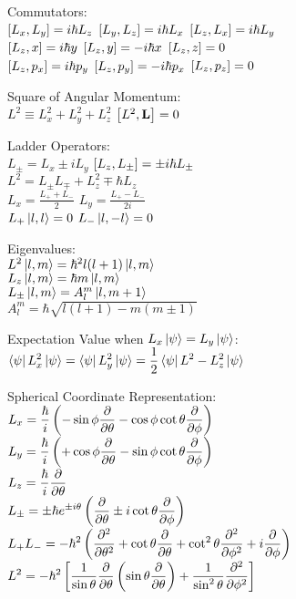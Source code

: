 \documentclass[12pt,landscape]{article}
\newcommand{\tab}{\hspace{.02\textwidth}}
\newcommand{\ds}{\displaystyle}
\begin{document}
\begin{multicols}{3}
Commutators:\\
\tab $\comm{L_x}{L_y} = i\hbar L_z$ \quad $\comm{L_y}{L_z} = i\hbar L_x$ \quad $\comm{L_z}{L_x} = i\hbar L_y$\\
\tab $\comm{L_z}{x} = i\hbar y$ \quad $\comm{L_z}{y} = -i\hbar x$ \quad $\comm{L_z}{z} = 0$\\
\tab $\comm{L_z}{p_x} = i\hbar p_y$ \quad $\comm{L_z}{p_y} = -i\hbar p_x$ \quad $\comm{L_z}{p_z} = 0$

Square of Angular Momentum:\\
\tab $L^2 \equiv L_x^2 + L_y^2 + L_z^2$ \qquad $\comm{L^2}{\vb{L}} = 0$

Ladder Operators:\\
\tab $L_\pm = L_x \pm iL_y$ \qquad $\comm{L_z}{L_\pm} = \pm i\hbar L_\pm$\\
\tab $L^2 = L_\pm L_\mp + L_z^2 \mp \hbar L_z$\\
\tab $\ds L_x = \frac{L_+ + L_-}{2}$ \qquad $\ds L_y = \frac{L_+ - L_-}{2i}$\\
\tab $L_+ \ket{l,l} = 0$ \qquad $L_- \ket{l,-l} =0$

Eigenvalues:\\
\tab $L^2 \ket{l,m} = \hbar^2 l(l+1)\ket{l,m}$\\
\tab $L_z \ket{l,m} = \hbar m \ket{l,m}$\\
\tab $L_\pm \ket{l,m} = A_l^m\ket{l,m+1}$\\
\tab $A_l^m = \hbar \sqrt{l(l+1) - m(m\pm 1)}$

Expectation Value when $L_x\ket{\psi} = L_y\ket{\psi}$:\\
\tab $\ds \bra{\psi}L_x^2\ket{\psi} = \bra{\psi}L_y^2\ket{\psi} = \frac{1}{2}\bra{\psi}L^2 - L_z^2\ket{\psi}$

Spherical Coordinate Representation:\\
\tab $L_x = \ds \frac{\hbar}{i}\left(-\sin\phi \pdv{\theta} - \cos\phi\cot\theta\pdv{\phi}\right)$\\
\tab $L_y = \ds \frac{\hbar}{i}\left(+\cos\phi \pdv{\theta} - \sin\phi\cot\theta\pdv{\phi}\right)$\\
\tab $\ds L_z = \frac{\hbar}{i}\pdv{\theta}$\\
\tab $\ds L_\pm = \pm\hbar e^{\pm i \theta}\left(\pdv{\theta} \pm i\cot\theta\pdv{\phi}\right)$\\
\tab $\ds L_+L_- = -\hbar^2\left(\pdv[2]{\theta}+\cot\theta\pdv{\theta} + \cot^2\theta\pdv[2]{\phi} + i\pdv{\phi}\right)$\\
\tab $\ds L^2 = -\hbar^2\left[\frac{1}{\sin\theta}\pdv{\theta}\left(\sin\theta\pdv{\theta}\right) + \frac{1}{\sin^2\theta}\pdv[2]{\phi}\right]$


\end{multicols}
\end{document}
